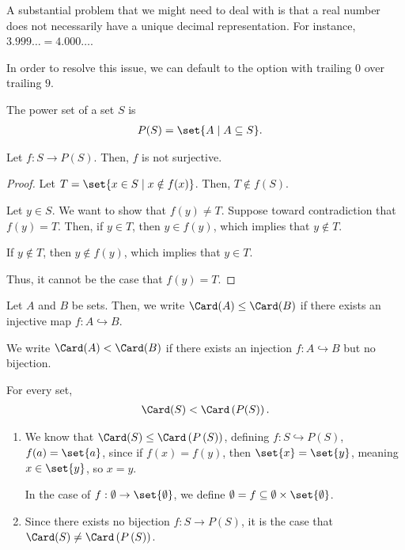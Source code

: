 \documentclass[10pt]{mypackage}
\begin{document}
\begin{note}
  A substantial problem that we might need to deal with is that a real number does not necessarily have a unique decimal representation. For instance, $3.999\dots = 4.000\dots$.\newline

  In order to resolve this issue, we can default to the option with trailing $0$ over trailing $9$.
\end{note}
\begin{definition}
The power set of a set $S$ is 
\begin{align*}
  P(S) &= \set{A\mid A\subseteq S}.
\end{align*}
\end{definition}
\begin{theorem}
  Let $f: S\rightarrow P\left(S\right)$. Then, $f$ is not surjective.
\end{theorem}
\begin{proof}
  Let $T = \set{x\in S\mid x\notin f(x)}$. Then, $T\notin f(S)$.\newline

  Let $y\in S$. We want to show that $f(y)\neq T$. Suppose toward contradiction that $f(y) = T$. Then, if $y\in T$, then $y\in f(y)$, which implies that $y\notin T$.\newline

  If $y\notin T$, then $y\notin f(y)$, which implies that $y\in T$.\newline

  Thus, it cannot be the case that $f(y) = T$.
\end{proof}
\begin{definition}
  Let $A$ and $B$ be sets. Then, we write $\Card(A) \leq \Card(B)$ if there exists an injective map $f: A\hookrightarrow B$.\newline

  We write $\Card(A) < \Card(B)$ if there exists an injection $f: A\hookrightarrow B$ but no bijection.
\end{definition}
\begin{example}
  For every set,
  \begin{align*}
    \Card(S) < \Card\left(P(S)\right).
  \end{align*}
  \begin{enumerate}[(1)]
    \item We know that $\Card(S) \leq \Card\left(P\left(S\right)\right)$, defining $f: S\hookrightarrow P\left(S\right)$, $f(a) = \set{a}$, since if $f(x) = f(y)$, then $\set{x} = \set{y}$, meaning $x \in \set{y}$, so $x = y$.\newline

      In the case of $f: \emptyset \rightarrow \set{\emptyset}$, we define $\emptyset = f\subseteq \emptyset\times\set{\emptyset}$.
    \item Since there exists no bijection $f: S\rightarrow P\left(S\right)$, it is the case that $\Card(S)\neq \Card\left(P\left(S\right)\right)$.
  \end{enumerate}
\end{example}
\end{document}
